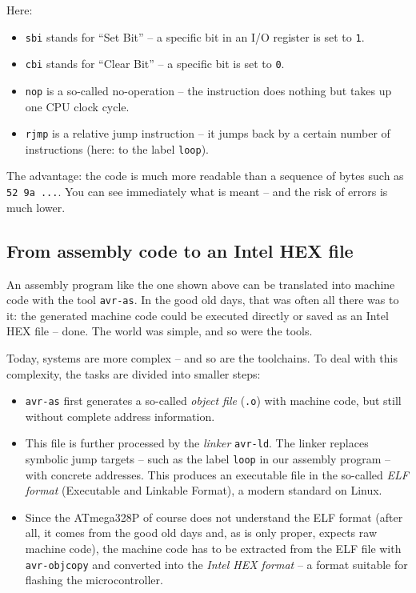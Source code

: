 \documentclass[a4paper,12pt]{article}
\begin{document}
\noindent
Here:
\begin{itemize}
    \item
	\texttt{sbi} stands for ``Set Bit'' – a specific bit in an I/O
	register is set to \texttt{1}.
    \item
	\texttt{cbi} stands for ``Clear Bit'' – a specific bit is set to
	\texttt{0}.
    \item
	\texttt{nop} is a so-called no-operation – the instruction does
	nothing but takes up one CPU clock cycle.
    \item
	\texttt{rjmp} is a relative jump instruction – it jumps back by a
	certain number of instructions (here: to the label \texttt{loop}).
\end{itemize}

\noindent
The advantage: the code is much more readable than a sequence of bytes such
as \texttt{52 9a ...}. You can see immediately what is meant – and the risk
of errors is much lower.

\subsection{From assembly code to an Intel HEX file}

An assembly program like the one shown above can be translated into machine
code with the tool \texttt{avr-as}. In the good old days, that was often all
there was to it: the generated machine code could be executed directly or
saved as an Intel HEX file – done. The world was simple, and so were the
tools.

Today, systems are more complex – and so are the toolchains. To deal with
this complexity, the tasks are divided into smaller steps:

\begin{itemize}
    \item
	\texttt{avr-as} first generates a so-called \emph{object file}
	(\texttt{.o}) with machine code, but still without complete address
	information.

    \item
	This file is further processed by the \emph{linker} \texttt{avr-ld}.
        The linker replaces symbolic jump targets – such as the label
        \texttt{loop} in our assembly program – with concrete addresses.
        This produces an executable file in the so-called
        \emph{ELF format} (Executable and Linkable Format), a modern
        standard on Linux.

    \item
	Since the ATmega328P of course does not understand the ELF format
	(after all, it comes from the good old days and, as is only proper,
	expects raw machine code), the machine code has to be extracted from
	the ELF file with \texttt{avr-objcopy} and converted into the
	\emph{Intel HEX format} – a format suitable for flashing the
	microcontroller.

\end{itemize}
\end{document}
